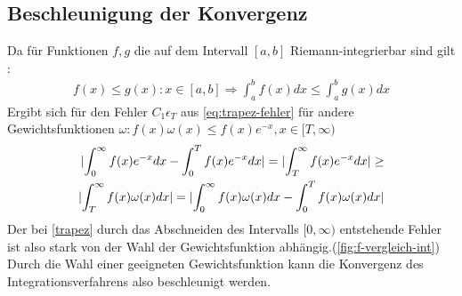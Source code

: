 \documentclass[12pt,a4paper]{scrartcl}
\numberwithin{equation}{section}
\numberwithin{myalgctr}{section}
\numberwithin{mytheoremctr}{section}
\numberwithin{mykorollarctr}{section}
\numberwithin{mylemmactr}{section}
\numberwithin{mybeispielctr}{section}
\DeclarePairedDelimiter{\abs}{\lvert}{\rvert}
\begin{document}
	\subsection{Beschleunigung der Konvergenz}
	Da f\"ur Funktionen $f,g$ die auf dem Intervall $[a,b]$ Riemann-integrierbar sind gilt \autocite[vgl.][271]{ana2}: 
	\begin{align*}
		f(x)\leq g(x): x \in [a,b]\Rightarrow \int_{a}^{b}f(x)dx \leq \int_{a}^{b}g(x)dx
	\end{align*}
	Ergibt sich f\"ur den Fehler $C_1\epsilon_T$ aus \cref{eq:trapez-fehler} f\"ur andere Gewichtsfunktionen $\omega : f(x)\omega(x) \leq f(x)e^{-x}, x \in [T,\infty)$
	\begin{align*}
		\abs{\int_{0}^{\infty}f(x)e^{-x}dx-\int_{0}^{T}f(x)e^{-x}dx} = \abs{\int_{T}^{\infty}f(x)e^{-x}dx} \geq \\
		 \abs{\int_{T}^{\infty}f(x)\omega(x)dx} =  \abs{\int_{0}^{\infty}f(x)\omega(x)dx-\int_{0}^{T}f(x)\omega(x)dx}
	\end{align*}	
	Der bei \cref{trapez} durch das Abschneiden des Intervalls $[0,\infty)$ entstehende Fehler ist also stark von der Wahl der Gewichtsfunktion abh\"angig.(\cref{fig:f-vergleich-int}) 
	Durch die Wahl einer geeigneten Gewichtsfunktion kann die Konvergenz des Integrationsverfahrens also beschleunigt werden.
	
\end{document}
